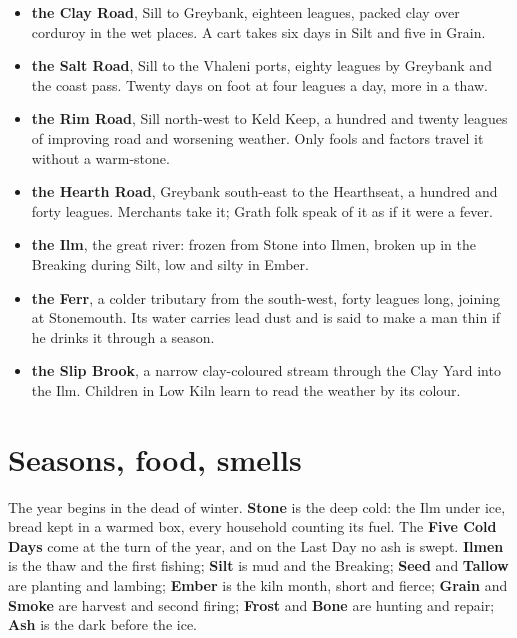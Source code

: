 \documentclass{design/chronicle}
\begin{document}
\begin{itemize}[leftmargin=1.4em,itemsep=1pt,topsep=3pt,parsep=0pt]

\item \textbf{the Clay Road}, Sill to Greybank, eighteen leagues, packed clay over corduroy in the wet places. A cart takes six days in Silt and five in Grain.

\item \textbf{the Salt Road}, Sill to the Vhaleni ports, eighty leagues by Greybank and the coast pass. Twenty days on foot at four leagues a day, more in a thaw.

\item \textbf{the Rim Road}, Sill north-west to Keld Keep, a hundred and twenty leagues of improving road and worsening weather. Only fools and factors travel it without a warm-stone.

\item \textbf{the Hearth Road}, Greybank south-east to the Hearthseat, a hundred and forty leagues. Merchants take it; Grath folk speak of it as if it were a fever.

\item \textbf{the Ilm}, the great river: frozen from Stone into Ilmen, broken up in the Breaking during Silt, low and silty in Ember.

\item \textbf{the Ferr}, a colder tributary from the south-west, forty leagues long, joining at Stonemouth. Its water carries lead dust and is said to make a man thin if he drinks it through a season.

\item \textbf{the Slip Brook}, a narrow clay-coloured stream through the Clay Yard into the Ilm. Children in Low Kiln learn to read the weather by its colour.

\end{itemize}

\section*{Seasons, food, smells}

The year begins in the dead of winter. \textbf{Stone} is the deep cold: the Ilm under ice, bread kept in a warmed box, every household counting its fuel. The \textbf{Five Cold Days} come at the turn of the year, and on the Last Day no ash is swept. \textbf{Ilmen} is the thaw and the first fishing; \textbf{Silt} is mud and the Breaking; \textbf{Seed} and \textbf{Tallow} are planting and lambing; \textbf{Ember} is the kiln month, short and fierce; \textbf{Grain} and \textbf{Smoke} are harvest and second firing; \textbf{Frost} and \textbf{Bone} are hunting and repair; \textbf{Ash} is the dark before the ice.
\end{document}
